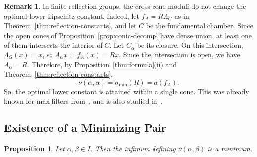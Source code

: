 \documentclass[11pt]{article}
\newtheorem{prop}[theor]{Proposition}
\theoremstyle{definition}
\newtheorem*{rem*}{Remark}
\begin{document}
\begin{rem*}
	In finite reflection groups, the cross-cone
	moduli do not change the optimal lower Lipschitz constant.
	Indeed, let $f_A=R\Lambda_G$ as in
	Theorem~\ref{thm:reflection-constants}, and let $C$ be the
	fundamental chamber. Since the open cones of
	Proposition~\ref{prop:conic-decomp} have dense union, at least
	one of them intersects the interior of $C$. Let $C_\alpha$
	be its closure. On this intersection, $\Lambda_G(x)=x$,
	so $A_\alpha x=f_A(x)=Rx$. Since the intersection is open,
	we have $A_\alpha=R$. Therefore, by
	Proposition~\ref{thm:formula}(ii) and
	Theorem~\ref{thm:reflection-constants},
	\[
	\nu(\alpha,\alpha)=\sigma_{\min}(R)=a(f_A).
	\]
	So, the optimal lower constant is attained within a
	single cone. This was already known for max filters
	from~\cite[Lem.~9]{mixonpacker}, and is also studied in~\cite[Lem.~27]{mixonqaddura}.
\end{rem*}


\subsection{Existence of a Minimizing Pair}

\begin{prop}\label{prop:mu-attained}
	Let $\alpha,\beta\in I$. Then the infimum defining $\nu(\alpha,\beta)$ is a minimum.
\end{prop}
\end{document}
